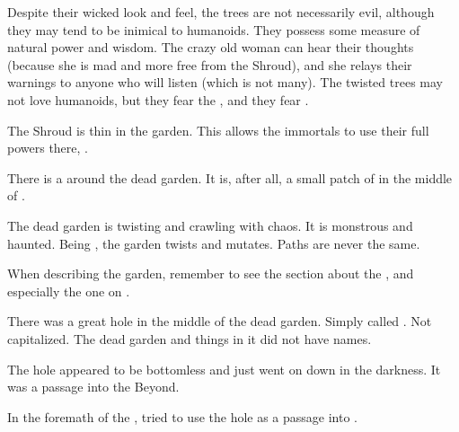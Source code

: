 Despite their wicked look and feel, the trees are not necessarily evil, although they may tend to be inimical to humanoids. They possess some measure of natural power and wisdom. The crazy old woman can hear their thoughts (because she is mad and more free from the Shroud), and she relays their warnings to anyone who will listen (which is not many). The twisted trees may not love humanoids, but they fear the \ghobaleth{}, and they fear \Nithdornazsh.

The Shroud is thin in the garden. 
This allows the immortals to use their full powers there, .


There is a  around the dead garden. 
It is, after all, a small patch of \wylde{} in the middle of \Malcur.
    
The dead garden is twisting and crawling with chaos.
It is monstrous and haunted.
Being \wylde, the garden twists and mutates.
Paths are never the same.

When describing the garden, remember to see the section about the , and especially the one on . 

There was a great hole in the middle of the dead garden.
Simply called . 
Not capitalized. 
The dead garden and things in it did not have names. 

The hole appeared to be bottomless and just went on down in the darkness. 
It was a passage into the Beyond. 

In the foremath of the \thirdbanewar, \Ishnaruchaefir tried to use the hole as a passage into \Azmith. 

